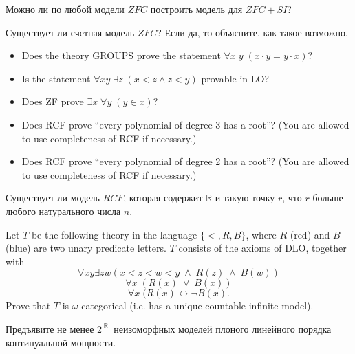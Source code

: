 \setcounter{curtask}{6}


\begin{task}
    Можно ли по любой модели $ZFC$ построить модель для $ZFC + SI$?
\end{task}

\begin{task}
    Существует ли счетная модель $ZFC$? Если да, то объясните, как такое возможно.
\end{task}

\begin{task}
    \begin{itemize}
        \item Does the theory GROUPS prove the statement $\forall x\; y\;
        	(x\cdot y = y \cdot x)$?
        \item Is the statement $\forall xy\; \exists z\; (x<z \wedge z<y)$ provable
	    in LO?
    	\item Does ZF prove $\exists x \; \forall y\; (y\in x)$?
    	\item Does RCF prove ``every polynomial of degree 3 has a root''?
			(You are allowed to use completeness of RCF if necessary.)
		 \item Does RCF prove ``every polynomial of degree 2 has a root''? 
			 (You are allowed to use completeness of RCF if necessary.)
    \end{itemize}
\end{task}

\begin{task}
  	Существует ли модель $RCF$, которая содержит $\mathbb{R}$ и такую точку $r$, что
    $r$ больше любого натурального числа $n$.
\end{task}

\breakline

\begin{ptask}{4}
    Let $T$ be the following theory in the language $\{<, R, B\}$, where $R$ (red) and $B$ (blue) are two unary predicate letters.
	$T$ consists of the axioms of DLO, together with 
	\[ \forall xy \exists zw (x<z<w<y \; \wedge \; R(z) \; \wedge \; B(w)) \]
	\[ \forall x \; (R(x)\; \vee \; B(x)) \]
	\[ \forall x \; (R(x) \leftrightarrow \neg B(x). \]
	Prove that $T$ is $\omega$-categorical (i.e. has a unique countable infinite model).
\end{ptask}

\begin{ptask}{5}
    Предъявите не менее $2^{|\mathbb{R}|}$ неизоморфных моделей плоного линейного порядка
    континуальной мощности.
\end{ptask}
